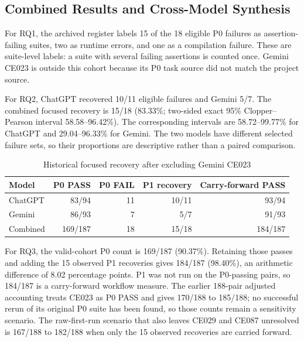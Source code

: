 \subsection{Combined Results and Cross-Model Synthesis}
\label{subsec:combined_results}
For RQ1, the archived register labels 15 of the 18 eligible P0 failures as assertion-failing suites, two as runtime errors, and one as a compilation failure. These are suite-level labels: a suite with several failing assertions is counted once. Gemini CE023 is outside this cohort because its P0 task source did not match the project source.

For RQ2, ChatGPT recovered 10/11 eligible failures and Gemini 5/7. The combined focused recovery is 15/18 (83.33\%; two-sided exact 95\% Clopper--Pearson interval 58.58--96.42\%). The corresponding intervals are 58.72--99.77\% for ChatGPT and 29.04--96.33\% for Gemini. The two models have different selected failure sets, so their proportions are descriptive rather than a paired comparison.

\begin{table}[t]
\caption{Historical focused recovery after excluding Gemini CE023}
\label{tab:combined}
\centering\scriptsize
\begin{tabular}{@{}lrrrr@{}}
\toprule
Model & P0 PASS & P0 FAIL & P1 recovery & Carry-forward PASS \\
\midrule
ChatGPT & 83/94 & 11 & 10/11 & 93/94 \\
Gemini & 86/93 & 7 & 5/7 & 91/93 \\
\midrule
Combined & 169/187 & 18 & 15/18 & 184/187 \\
\bottomrule
\end{tabular}
\end{table}

For RQ3, the valid-cohort P0 count is 169/187 (90.37\%). Retaining those passes and adding the 15 observed P1 recoveries gives 184/187 (98.40\%), an arithmetic difference of 8.02 percentage points. P1 was not run on the P0-passing pairs, so 184/187 is a carry-forward workflow measure. The earlier 188-pair adjusted accounting treats CE023 as P0 PASS and gives 170/188 to 185/188; no successful rerun of its original P0 suite has been found, so those counts remain a sensitivity scenario. The raw-first-run scenario that also leaves CE029 and CE087 unresolved is 167/188 to 182/188 when only the 15 observed recoveries are carried forward.

